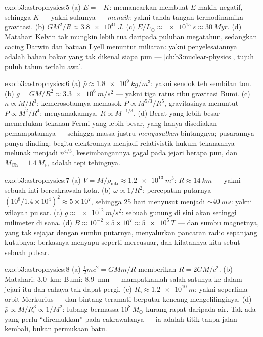 \begin{solution}{exo:b3:astrophysics:5}
(a) $E = -K$: memancarkan membuat $E$ makin negatif, sehingga $K$ ---
yakni suhunya --- \emph{menaik}: yakni tanda tangan termodinamika gravitasi. (b) $GM^2/R \approx \qty{3.8e41}{J}$. (c)
$E/L_\odot \approx \qty{e15}{s} \approx \qty{30}{Myr}$. (d)
Matahari Kelvin tak mungkin lebih tua daripada puluhan megatahun, sedangkan
cacing Darwin dan batuan Lyell menuntut miliaran: yakni
penyelesaiannya adalah bahan bakar yang tak dikenal siapa pun --- \cref{ch:b3:nuclear-physics},
tujuh puluh tahun terlalu awal.
\end{solution}

\begin{solution}{exo:b3:astrophysics:6}
(a) $\bar\rho \approx \qty{1.8e9}{kg/m^3}$: yakni sendok teh
sembilan ton. (b) $g = GM/R^2 \approx \qty{3.3e6}{m/s^2}$ --- yakni tiga
ratus ribu gravitasi Bumi. (c) $n \propto M/R^3$:
kemerosotannya memasok $P \propto M^{5/3}/R^5$, gravitasinya menuntut
$P \propto M^2/R^4$; menyamakannya, $R \propto M^{-1/3}$. (d) Berat
yang lebih besar memerlukan tekanan Fermi yang lebih besar, yang hanya disediakan
pemampatannya --- sehingga massa justru \emph{menyusutkan} bintangnya; pusarannya punya
dinding: begitu elektronnya menjadi relativistik hukum tekanannya melunak menjadi
$n^{4/3}$, keseimbangannya gagal pada jejari berapa pun, dan
$M_{\text{Ch}} = 1.4\,M_\odot$ adalah tepi tebingnya.
\end{solution}

\begin{solution}{exo:b3:astrophysics:7}
(a) $V = M/\rho_{\text{inti}} \approx \qty{1.2e13}{m^3}$:
$R \approx \qty{14}{km}$ --- yakni sebuah inti bercakrawala kota. (b)
$\omega \propto 1/R^2$: percepatan putarnya $(10^8/1.4\times10^4)^2
\approx 5\times10^{7}$, sehingga 25 hari menyusut menjadi
${\sim}\qty{40}{ms}$: yakni wilayah pulsar. (c) $g \approx
\qty{e12}{m/s^2}$: sebuah gunung di sini akan setinggi milimeter di sana.
(d) $B \approx 10^{-2}\times5\times10^{7} \approx
\qty{5e5}{T}$ --- dan sumbu magnetnya, yang tak sejajar dengan sumbu
putarnya, menyalurkan pancaran radio sepanjang kutubnya: berkasnya
menyapu seperti mercusuar, dan kilatannya kita sebut sebuah pulsar.
\end{solution}

\begin{solution}{exo:b3:astrophysics:8}
(a) $\tfrac12mc^2 = GMm/R$ memberikan $R = 2GM/c^2$. (b) Matahari:
\qty{3.0}{km}; Bumi: \qty{8.9}{mm} --- mampatkanlah salah satunya ke dalam
jejari itu dan cahaya tak dapat pergi. (c) $R_{\text{s}} \approx
\qty{1.2e10}{m}$: yakni seperlima orbit Merkurius --- dan bintang teramati
berputar kencang mengelilinginya. (d) $\bar\rho \propto
M/R_{\text{s}}^3 \propto 1/M^2$: lubang bermassa $10^8\,M_\odot$ kurang
rapat daripada air. Tak ada yang perlu ``diremukkan'' pada cakrawalanya ---
ia adalah titik tanpa jalan kembali, bukan permukaan batu.
\end{solution}

